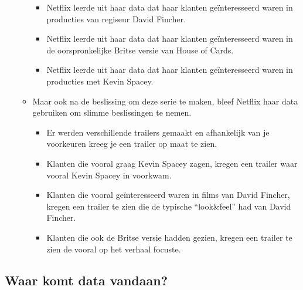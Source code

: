 \documentclass[]{tufte-book}
\providecommand{\tightlist}{%
  \setlength{\itemsep}{0pt}\setlength{\parskip}{0pt}}
\begin{document}
\begin{itemize}
\begin{itemize}
    \begin{itemize}
    \tightlist
    \item
      Netflix leerde uit haar data dat haar klanten geïnteresseerd waren in producties van regiseur David Fincher.
    \item
      Netflix leerde uit haar data dat haar klanten geïnteresseerd waren in de oorspronkelijke Britse versie van House of Cards.
    \item
      Netflix leerde uit haar data dat haar klanten geïnteresseerd waren in producties met Kevin Spacey.
    \end{itemize}
  \item
    Maar ook na de beslissing om deze serie te maken, bleef Netflix haar data gebruiken om slimme beslissingen te nemen.

    \begin{itemize}
    \tightlist
    \item
      Er werden verschillende trailers gemaakt en afhankelijk van je voorkeuren kreeg je een trailer op maat te zien.
    \item
      Klanten die vooral graag Kevin Spacey zagen, kregen een trailer waar vooral Kevin Spacey in voorkwam.
    \item
      Klanten die vooral geïnteresseerd waren in films van David Fincher, kregen een trailer te zien die de typische ``look\&feel'' had van David Fincher.
    \item
      Klanten die ook de Britse versie hadden gezien, kregen een trailer te zien de vooral op het verhaal focuste.
    \end{itemize}
  \end{itemize}
\end{itemize}

\hypertarget{waar-komt-data-vandaan}{%
\subsection{Waar komt data vandaan?}\label{waar-komt-data-vandaan}}
\end{document}

